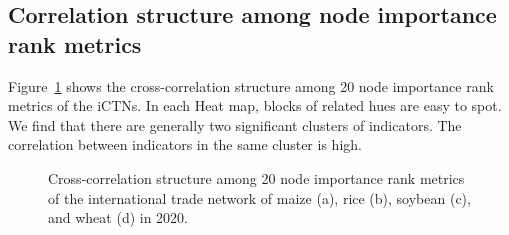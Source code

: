 \documentclass[preprint,3p,times,sort&compress]{elsarticle}
\begin{document}


\subsection{Correlation structure among node importance rank metrics}
\label{S3-2:Correlation}

Figure~\ref{Fig:iCTN:HeatMap:corrCoefficient:2020:20} shows the cross-correlation structure among 20 node importance rank metrics of the iCTNs. In each Heat map, blocks of related hues are easy to spot. We find that there are generally two significant clusters of indicators. The correlation between indicators in the same cluster is high.

\begin{figure}[h!]
     \subfigbottomskip=-1pt
     \subfigcapskip=-5pt
     \centering
      \caption{Cross-correlation structure among 20 node importance rank metrics of the international trade network of maize (a), rice (b), soybean (c), and wheat (d) in 2020.}
      \label{Fig:iCTN:HeatMap:corrCoefficient:2020:20}
\end{figure}
\end{document}

